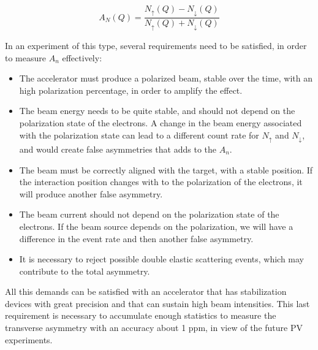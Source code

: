 \begin{equation}
A_{N} (Q) = \dfrac{N_{\uparrow}(Q) - N_{\downarrow}(Q)}{N_{\uparrow}(Q) + N_{\downarrow}(Q)}  
\end{equation} 

In an experiment of this type, several requirements need to be satisfied, in order to measure $A_{n}$ effectively:

\begin{itemize}
\item The accelerator must produce a polarized beam, stable over the time, with an high polarization percentage, in order to amplify the effect.
\item The beam energy needs to be quite stable, and should not depend on the polarization state of the electrons. A change in the beam energy associated with the polarization state can lead to a different count rate for $N_{\uparrow}$ and $N_{\downarrow}$, and would create false asymmetries that adds to the $A_{n}$.
\item The beam must be correctly aligned with the target, with a stable position. If the interaction position changes with to the polarization of the electrons, it will produce another false asymmetry.
\item The beam current should not depend on the polarization state of the electrons. If the beam source depends on the polarization, we will have a difference in the event rate and then another false asymmetry.
\item It is necessary to reject possible double elastic scattering events, which may contribute to the total asymmetry. 
\end{itemize}

All this demands can be satisfied with an accelerator that has stabilization devices with great precision and that can sustain high beam intensities. This last requirement is necessary to accumulate enough statistics to measure the transverse asymmetry with an accuracy about 1 ppm, in view of the future PV experiments.
